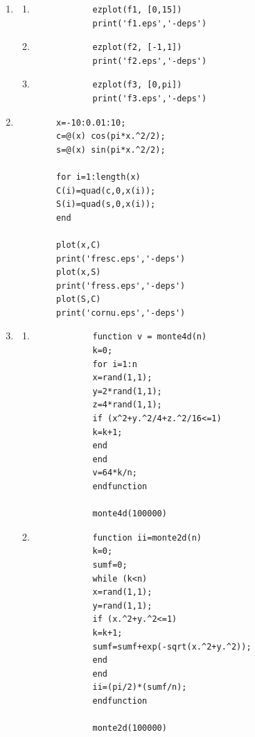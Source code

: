 \documentclass[11pt,a4paper]{article}
\begin{document}
\begin{enumerate}
	\item 
	\begin{enumerate}
		\item
		\begin{verbatim}
			ezplot(f1, [0,15])
			print('f1.eps','-deps')
		\end{verbatim}
		
		\item
		\begin{verbatim}
			ezplot(f2, [-1,1])
			print('f2.eps','-deps')
		\end{verbatim}
		
		\item
		\begin{verbatim}
			ezplot(f3, [0,pi])
			print('f3.eps','-deps')
		\end{verbatim}
	\end{enumerate}
		
	\item
	\begin{verbatim}
		x=-10:0.01:10;
		c=@(x) cos(pi*x.^2/2);
		s=@(x) sin(pi*x.^2/2);
		
		for i=1:length(x)
		C(i)=quad(c,0,x(i));
		S(i)=quad(s,0,x(i));
		end
		
		plot(x,C)
		print('fresc.eps','-deps')
		plot(x,S)
		print('fress.eps','-deps')
		plot(S,C)
		print('cornu.eps','-deps')
	\end{verbatim}
	
	\item
	\begin{enumerate}
		\item
		\begin{verbatim}
			function v = monte4d(n)
			k=0;
			for i=1:n
			x=rand(1,1);
			y=2*rand(1,1);
			z=4*rand(1,1);
			if (x^2+y.^2/4+z.^2/16<=1)
			k=k+1;
			end
			end
			v=64*k/n;
			endfunction
			
			monte4d(100000)
		\end{verbatim}
		
		\pagebreak
		
		\item
		\begin{verbatim}
			function ii=monte2d(n)
			k=0;
			sumf=0;
			while (k<n)
			x=rand(1,1);
			y=rand(1,1);
			if (x.^2+y.^2<=1)
			k=k+1;
			sumf=sumf+exp(-sqrt(x.^2+y.^2));
			end
			end
			ii=(pi/2)*(sumf/n);
			endfunction
			
			monte2d(100000)
		\end{verbatim}
		

\end{enumerate}
\end{enumerate}
\end{document}

